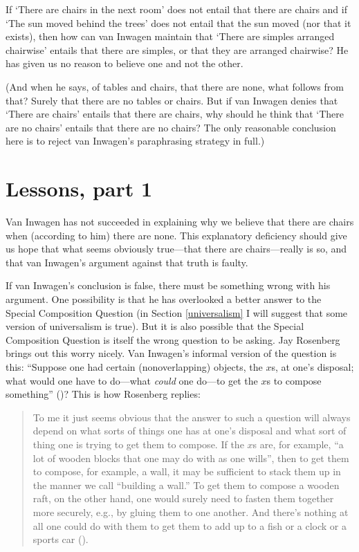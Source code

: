 \documentclass[12pt,twoside]{reedfancy}
\begin{document}
\begin{spacing}{1.25}
If `There are chairs in the next room' does not entail that there are
chairs and if `The sun moved behind the trees' does not entail that
the sun moved (nor that it exists), then how can van Inwagen maintain
that `There are simples arranged chairwise' entails that there are
simples, or that they are arranged chairwise?  He has given us no
reason to believe one and not the other.

(And when he says, of tables and chairs, that there are none, what
follows from that?  Surely that there are no tables or chairs.  But if
van Inwagen denies that `There are chairs' entails that there are
chairs, why should he think that `There are no chairs' entails that
there are no chairs?  The only reasonable conclusion here is to reject
van Inwagen's paraphrasing strategy in full.)

\section{Lessons, part 1}
\label{lessons-v}
Van Inwagen has not succeeded in explaining why we believe that there
are chairs when (according to him) there are none.  This explanatory
deficiency should give us hope that what seems obviously true---that
there are chairs---really is so, and that van Inwagen's argument
against that truth is faulty.

If van Inwagen's conclusion is false, there must be something wrong
with his argument.  One possibility is that he has overlooked a better
answer to the Special Composition Question (in Section
\ref{universalism} I will suggest that some version of universalism is
true).  But it is also possible that the Special Composition Question
is itself the wrong question to be asking.  Jay Rosenberg brings out
this worry nicely.  Van Inwagen's informal version of the question is
this: ``Suppose one had certain (nonoverlapping) objects, the $x$s, at
one's disposal; what would one have to do---what {\em could} one
do---to get the $x$s to compose something''
(\citeyear[31]{inwagen1995})?  This is how Rosenberg replies:

\begin{quote}
To me it just seems obvious that the answer to such a question will
always depend on what sorts of things one has at one's disposal and
what sort of thing one is trying to get them to compose.  If the $x$s
are, for example, ``a lot of wooden blocks that one may do with as one
wills'', then to get them to compose, for example, a wall, it may be
sufficient to stack them up in the manner we call ``building a wall.''
To get them to compose a wooden raft, on the other hand, one would
surely need to fasten them together more securely, e.g., by gluing
them to one another.  And there's nothing at all one could do with
them to get them to add up to a fish or a clock or a sports car
(\citeyear[705]{rosenberg1993}).
\end{quote}


\end{spacing}
\end{document}
